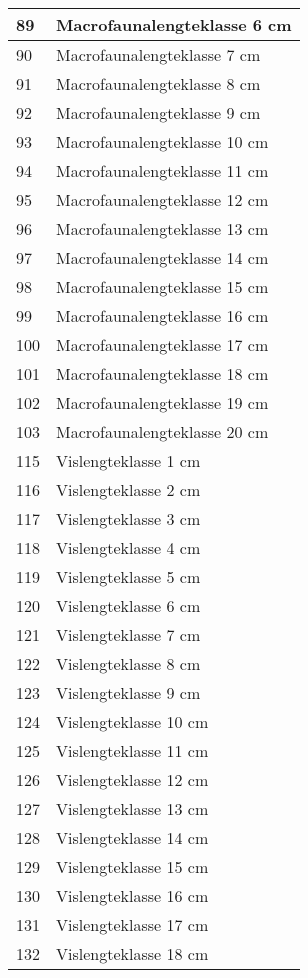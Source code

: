 \documentclass[
]{book}
\begin{document}
\begin{table}
\begin{tabular}[t]{l|l}
\hline
89 & Macrofaunalengteklasse 6 cm\\
\hline
90 & Macrofaunalengteklasse 7 cm\\
\hline
91 & Macrofaunalengteklasse 8 cm\\
\hline
92 & Macrofaunalengteklasse 9 cm\\
\hline
93 & Macrofaunalengteklasse 10 cm\\
\hline
94 & Macrofaunalengteklasse 11 cm\\
\hline
95 & Macrofaunalengteklasse 12 cm\\
\hline
96 & Macrofaunalengteklasse 13 cm\\
\hline
97 & Macrofaunalengteklasse 14 cm\\
\hline
98 & Macrofaunalengteklasse 15 cm\\
\hline
99 & Macrofaunalengteklasse 16 cm\\
\hline
100 & Macrofaunalengteklasse 17 cm\\
\hline
101 & Macrofaunalengteklasse 18 cm\\
\hline
102 & Macrofaunalengteklasse 19 cm\\
\hline
103 & Macrofaunalengteklasse 20 cm\\
\hline
115 & Vislengteklasse 1 cm\\
\hline
116 & Vislengteklasse 2 cm\\
\hline
117 & Vislengteklasse 3 cm\\
\hline
118 & Vislengteklasse 4 cm\\
\hline
119 & Vislengteklasse 5 cm\\
\hline
120 & Vislengteklasse 6 cm\\
\hline
121 & Vislengteklasse 7 cm\\
\hline
122 & Vislengteklasse 8 cm\\
\hline
123 & Vislengteklasse 9 cm\\
\hline
124 & Vislengteklasse 10 cm\\
\hline
125 & Vislengteklasse 11 cm\\
\hline
126 & Vislengteklasse 12 cm\\
\hline
127 & Vislengteklasse 13 cm\\
\hline
128 & Vislengteklasse 14 cm\\
\hline
129 & Vislengteklasse 15 cm\\
\hline
130 & Vislengteklasse 16 cm\\
\hline
131 & Vislengteklasse 17 cm\\
\hline
132 & Vislengteklasse 18 cm\\

\end{tabular}
\end{table}
\end{document}
